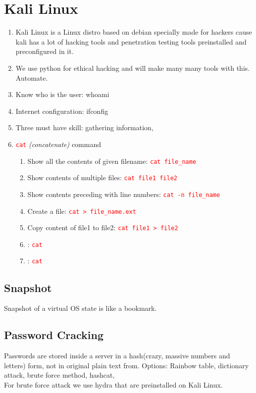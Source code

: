 \documentclass[12 pt, letterpaper]{extarticle}
\newcommand{\R}{\textcolor{red}} %
\newcommand{\T}{\texttt}
\begin{document}
\begin{enumerate}
\end{enumerate}

\section*{Kali Linux}
\begin{enumerate}
	\item Kali Linux is a Linux distro based on debian specially made for hackers cause kali has a lot of hacking tools and penetration testing tools preinstalled and preconfigured in it.
	\item We use python for ethical hacking and will make many many tools with this. Automate.
	\item Know who is the user: whoami
	\item Internet configuration: ifconfig
	\item Three must have skill: gathering information, 	
	
	\item \R{\T{cat}} \textit{(concatenate)} command
		\begin{enumerate}
			\item Show all the contents of given  filename: \R{\T{cat file\_name}}
			\item Show contents of multiple files: \R{\T{cat file1 file2}}
			\item Show contents preceding with line numbers: \R{\T{cat -n file\_name}}
			\item Create a file: \R{\T{cat > file\_name.ext}}
			\item Copy content of file1 to file2: \R{\T{cat file1 > file2}}
			\item : \R{\T{cat }}
			\item : \R{\T{cat }}
		\end{enumerate}
\end{enumerate}

\subsection{Snapshot}
Snapshot of a virtual OS state is like a bookmark.

\subsection{Password Cracking}
Passwords are stored inside a server in a hash(crazy, massive numbers and letters) form, not in original plain text from.
Options: Rainbow table, dictionary attack, brute force method, hashcat, \\
For brute force attack we use hydra that are preinstalled on Kali Linux.
\end{document}
